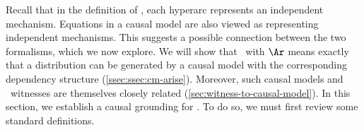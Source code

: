 Recall that in the definition of \Scibility, each hyperarc represents an independent mechanism. 
Equations in a causal model are also viewed as representing independent
mechanisms.  
This suggests a possible connection between the two formalisms, which we now explore.
We will show that \scibility\ with $\Ar$ means exactly that
a distribution can be generated by a causal model with the corresponding dependency structure (\cref{ssec:ssec:cm-arise}). Moreover, such causal models and \scibility\ witnesses are themselves closely related (\cref{sec:witness-to-causal-model}).
In this section, we establish a causal grounding for \scibility.
To do so, we must first review some standard definitions.


